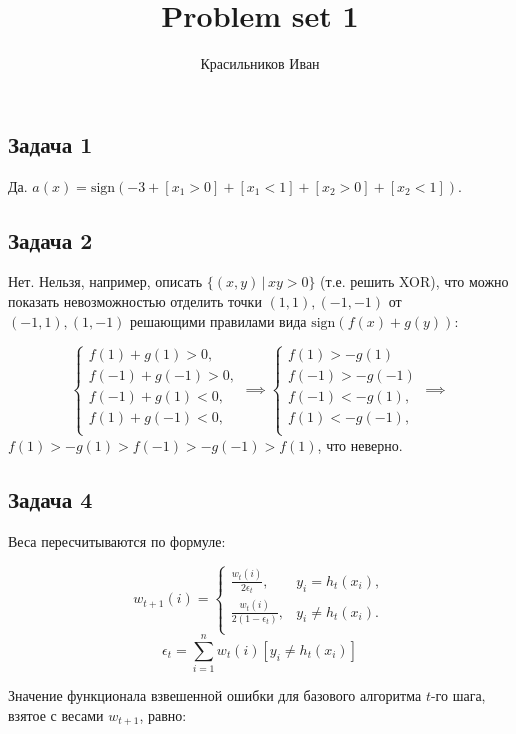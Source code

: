 \documentclass[a4paper, 12pt, onepage]{article}
\begin{document}
\author{Красильников Иван}
\title{Problem set 1}
\maketitle

\subsection*{Задача 1}
Да. $a(x) = \mbox{sign}\left(-3 + [x_1 > 0] + [x_1 < 1] + [x_2 > 0] + [x_2 < 1]\right)$.

\subsection*{Задача 2}
Нет. Нельзя, например, описать $\{ (x, y)\,|\,xy > 0 \}$ (т.е. решить XOR), что можно показать
невозможностью отделить точки $(1, 1), (-1, -1)$ от $(-1, 1), (1, -1)$ решающими правилами
вида $\mbox{sign}(f(x) + g(y))$:

$$
\begin{cases}
f(1) + g(1) > 0, \\
f(-1) + g(-1) > 0, \\
f(-1) + g(1) < 0, \\
f(1) + g(-1) < 0, \\
\end{cases}
\implies
\begin{cases}
f(1) > -g(1) \\
f(-1) > -g(-1) \\
f(-1) < -g(1), \\
f(1) < -g(-1), \\
\end{cases}
\implies
$$
$f(1) > -g(1) > f(-1) > -g(-1) > f(1)$, что неверно.



\newpage
\subsection*{Задача 4}

Веса пересчитываются по формуле:

$$ w_{t+1}(i) = 
\begin{cases}
  \frac{w_{t}(i)}{2 \epsilon_t}, & y_i = h_t(x_i), \\
  \frac{w_{t}(i)}{2 (1 - \epsilon_t)}, & y_i \ne h_t(x_i). \\
\end{cases}
$$
$$
\epsilon_t = \sum_{i=1}^n w_t(i) [y_i \ne h_t(x_i)]
$$

Значение функционала взвешенной ошибки для базового алгоритма $t$-го шага, взятое с весами $w_{t+1}$, равно:
\end{document}
